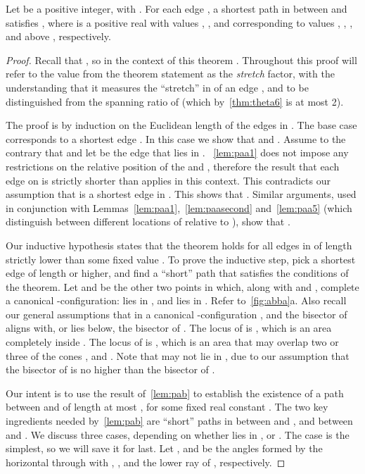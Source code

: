 \documentclass[runningheads,a4paper]{llncs}
\begin{document}
\begin{theorem}
Let  be a positive integer, with . For each edge , a shortest path in  between  and  satisfies , where  is a positive real with values , ,  and  corresponding to  values , , , and above , respectively.
\label{thm:maintheta}
\end{theorem}
\begin{proof}
Recall that , so in the context of this theorem . Throughout this proof will refer to the value  from the theorem statement as the \emph{stretch} factor, with the understanding that it measures the ``stretch'' in  of an edge , and to be distinguished from the spanning ratio of  (which by~\autoref{thm:theta6} is at most 2). 

The proof is by induction on the Euclidean length of the edges in . 
The base case corresponds to a shortest edge .
In this case we show that  and . Assume to the contrary that
 and let   be the edge that lies in . 
~\autoref{lem:paa1} does not impose any restrictions on the relative position of the  and , therefore the result that 
each edge on  is strictly shorter than  applies in this context. 
This contradicts our assumption that  is a shortest edge in . This shows that . 
Similar arguments, used in conjunction with Lemmas~\ref{lem:paa1},~\ref{lem:paasecond} and~\ref{lem:paa5} (which distinguish between different locations of  relative to ), show that .

Our inductive hypothesis states that the theorem holds for all edges in  of length strictly lower than some fixed value . To prove the inductive step, pick a shortest edge  of length  or higher, and find a ``short'' path  that satisfies the conditions of the theorem. Let  and  be the other two points in  which, along with  and , complete a canonical -configuration:  lies in , and 
 lies in . Refer to~\autoref{fig:abba}a. Also recall our general assumptions that in a canonical -configuration , and the bisector of  aligns with, or lies below, the bisector of . 
The locus of  is , which is an area completely inside . 
The locus of  is , which is an area that may overlap two or three of the cones ,  and .  Note that  may not lie in , due to our assumption that the bisector of  is no higher than the bisector of . 

Our intent is to use the result of~\autoref{lem:pab} to establish the existence of a path between  and  of length at most , for some fixed real constant . The two key ingredients needed by~\autoref{lem:pab} are ``short'' paths in  between  and , and between  and . 
We discuss three cases,  depending on whether  lies in ,  or . The case 
 is the simplest, so we will save it for last. 
Let ,  and  be the angles formed by the horizontal through  with , , and the lower ray of , respectively. 


\end{proof}
\end{document}
